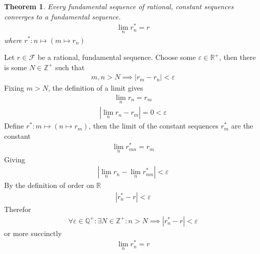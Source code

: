 \documentclass{amsart}
\numberwithin{equation}{section}
\let\oldendproof\endproof
\renewenvironment{proof}[1][\proofname]{%
  \setcounter{case}{0}
  \setcounter{step}{0}
  \oldproof[#1]%
}{\oldendproof}
\theoremstyle{plain}
\newtheorem{theorem}{Theorem}[section]
\theoremstyle{definition}
\theoremstyle{remark}
\begin{document}
\begin{theorem}
  Every fundamental sequence of rational, constant sequences converges to a fundamental sequence.
  \begin{align}
    \lim_n r^*_n = r
  \end{align}
  where $r^*: n \mapsto ( m \mapsto r_n)$
\end{theorem}
\begin{proof}
  Let $r\in\mathcal{F}$ be a rational, fundamental sequence. Choose some $\varepsilon\in\mathbb{R}^+$, then there is some $N\in\mathbb{Z}^+$ such that
  \begin{align}
    m,n > N \implies |r_m - r_n | <\varepsilon
  \end{align}
  Fixing $m>N$, the definition of a limit gives
  \begin{align}
    \lim_n r_n = r_m
  \end{align}
  \begin{align}
    \left|\lim_n r_n - r_m \right| = 0 < \varepsilon
  \end{align}
  Define $r^*: m  \mapsto (n \mapsto r_m)$, then the limit of the constant sequences $r_m^*$ are the constant
  \begin{align}
    \lim_n r_{mn}^* = r_m
  \end{align}
  Giving
  \begin{align}
    \left|\lim_n r_n - \lim_n r_{mn}^* \right| < \varepsilon
  \end{align}
  By the definition of order on $\mathbb{R}$
  \begin{align}
    |r_n^* - r | < \varepsilon
  \end{align}
  Therefor
  \begin{align}
    \forall \varepsilon\in\mathbb{Q}^+: \exists N \in \mathbb{Z}^+: n > N \implies |r_n^* - r| < \varepsilon
  \end{align}
  or more succinctly
  \begin{align}
    \lim_n r_n^* = r
  \end{align}
\end{proof}
\end{document}
